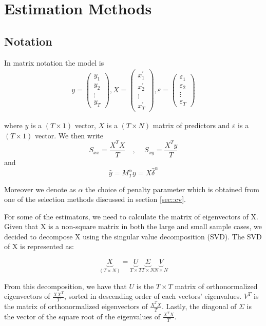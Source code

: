 \section{Estimation Methods} \label{sec::Est}

\subsection{Notation} \label{sec::Notation}

In matrix notation the model is 
\begin{align*}
y=\left(\begin{array}{c}
y_{1} \\
y_{2} \\
\vdots \\
y_{T}
\end{array}\right), X=\left(\begin{array}{c}
x_{1}^{\prime} \\
x_{2}^{\prime} \\
\vdots \\
x_{T}^{\prime}
\end{array}\right), \varepsilon=\left(\begin{array}{c}
\varepsilon_{1} \\
\varepsilon_{2} \\
\vdots \\
\varepsilon_{T}
\end{array}\right)
\end{align*}


where $y$ is a $(T \times 1)$ vector, $X$ is a $(T \times N)$ matrix of predictors and $\varepsilon$ is a $(T \times 1)$ vector. We then write 
\[S_{xx} = \frac{X^{T} X}{T} \quad \text{, } \quad S_{xy} = \frac{X^{T} y}{T} \]
and 
\[\widehat{y} = M_{T}^{\alpha} y = X \widehat{\delta}^{\alpha}\]

Moreover we denote as $\alpha$ the choice of penalty parameter which is obtained from one of the selection methods discussed in section \ref{sec::cv}.

For some of the estimators, we need to calculate the matrix of eigenvectors of X. Given that X is a non-square matrix in both the large and small sample cases, we decided to decompose X using the singular value decomposition (SVD). The SVD of X is represented as:

\[\underbrace{X}_{(T \times N)} = \underbrace{U}_{T \times T} \underbrace{\Sigma}_{T \times N} \underbrace{V}_{N \times N}\]

From this decomposition, we have that $U$ is the $T \times T$ matrix of orthonormalized eigenvectors of $\frac{X X^{T}}{T}$, sorted in descending order of each vectors' eigenvalues. $V^{T}$ is the matrix of orthonormalized eigenvectors of $\frac{X^{T} X}{T}$. Lastly, the diagonal of $\Sigma$ is the vector of the square root of the eigenvalues of $\frac{X^{T} X}{T}$.

